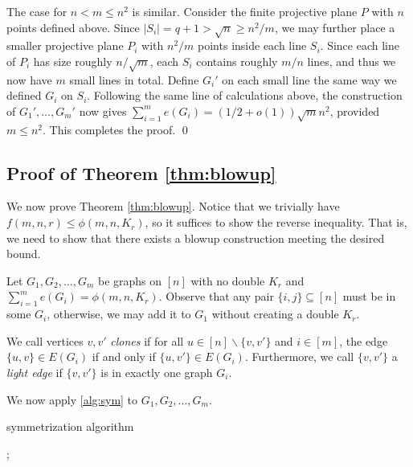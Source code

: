 \documentclass[12pt]{article}
\begin{document}
The case for $n < m \leq n^2$ is similar. Consider the finite projective plane $P$ with $n$ points defined above. Since $|S_i| = q + 1 > \sqrt{n} \geq n^2/m$, we may further place a smaller projective plane $P_i$ with $n^2/m$ points inside each line $S_i$. Since each line of $P_i$ has size roughly $n/\sqrt{m}$, each $S_i$ contains roughly $m/n$ lines, and thus we now have $m$ small lines in total. Define $G_i'$ on each small line the same way we defined $G_i$ on $S_i$. Following the same line of calculations above, the construction of $G_1', \ldots, G_m'$ now gives $\sum_{i = 1}^m e(G_i) = (1/2 + o(1))\sqrt{m}n^2$, provided $m \leq n^2$. This completes the proof. \qed

\subsection{Proof of Theorem \ref{thm:blowup}}

We now prove Theorem \ref{thm:blowup}. Notice that we trivially have $f(m, n, r) \leq \phi(m, n, K_r)$, so it suffices to show the reverse inequality. That is, we need to show that there exists  a blowup construction meeting the desired bound.

Let $G_1, G_2, \ldots, G_m$ be graphs on $[n]$ with no double $K_r$ and $\sum_{i = 1}^m e(G_i) = \phi(m, n, K_r)$. Observe that any pair $\{i, j\} \subseteq [n]$ must be in some $G_i$, otherwise, we may add it to $G_1$ without creating a double $K_r$. 

We call vertices $v, v'$ \textit{clones} if for all $u \in [n] \backslash \{v, v'\}$ and $i \in [m]$, the edge $\{u, v\} \in E(G_i)$ if and only if $\{u, v'\} \in E(G_i)$. Furthermore, we call $\{v, v'\}$ a \textit{light edge} if $\{v, v'\}$ is in exactly one graph $G_i$.

We now apply \cref{alg:sym} to $G_1, G_2, \ldots, G_m$. 

\begin{algorithm}[H]
  \caption{symmetrization algorithm}\label{alg:sym}
  \begin{algorithmic}
    \;
    \;
    \;
    \;
    \;
    ;
    \;
        \;
    \EndIf		
    \EndFor
    \EndWhile
    \EndWhile
  \end{algorithmic}
\end{algorithm}
\end{document}
